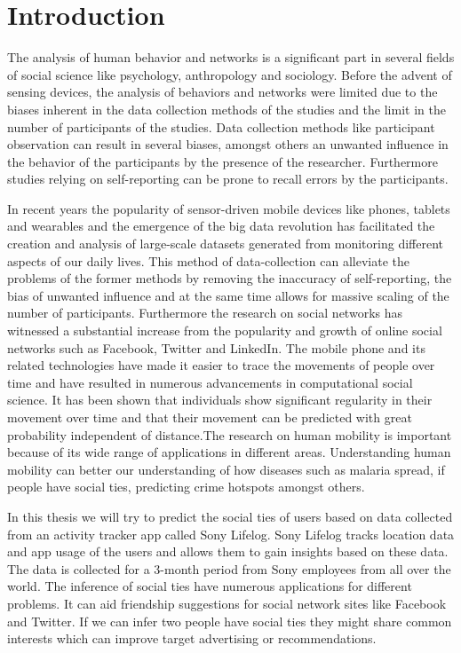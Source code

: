 \chapter{Introduction}
\label{chap:Introduction}

The analysis of human behavior and networks is a significant part in several fields of social science like psychology, anthropology and sociology. Before the advent of sensing devices, the analysis of behaviors and networks were limited due to the biases inherent in the data collection methods of the studies and the limit in the number of participants of the studies. Data collection methods like participant observation can result in several biases, amongst others an unwanted influence in the behavior of the participants by the presence of the researcher\cite{rosenthal1966experimenter}. Furthermore studies relying on self-reporting can be prone to recall errors by the participants\cite{stone1999science}.

In recent years the popularity of sensor-driven mobile devices like phones, tablets and wearables and the emergence of the big data revolution has facilitated the creation and analysis of large-scale datasets generated from monitoring different aspects of our daily lives\cite{lazer2009life}. This method of data-collection can alleviate the problems of the former methods by removing the inaccuracy of self-reporting, the bias of unwanted influence and at the same time allows for massive scaling of the number of participants. Furthermore the research on social networks has witnessed a substantial increase from the popularity and growth of online social networks such as Facebook, Twitter and LinkedIn\cite{social_networks}. The mobile phone and its related technologies have made it easier to trace the movements of people over time and have resulted in numerous advancements in computational social science. It has been shown that individuals show significant regularity in their movement over time\cite{gonzalez2008understanding} and that their movement can be predicted with great probability independent of distance\cite{song2010limits}.The research on human mobility is important because of its wide range of applications in different areas. Understanding human mobility can better our understanding of how diseases such as malaria spread\cite{wesolowski2012quantifying}, if people have social ties\cite{ISTfGC}, predicting crime hotspots\cite{bogomolov2014once} amongst others.

In this thesis we will try to predict the social ties of users based on data collected from an activity tracker app called Sony Lifelog\cite{sonyLifeLog}. Sony Lifelog tracks location data and app usage of the users and allows them to gain insights based on these data. The data is collected for a 3-month period from Sony employees from all over the world.
The inference of social ties have numerous applications for different problems. It can aid friendship suggestions for social network sites like Facebook and Twitter. If we can infer two people have social ties they might share common interests which can improve target advertising or recommendations\cite{yu2015investigating}.

